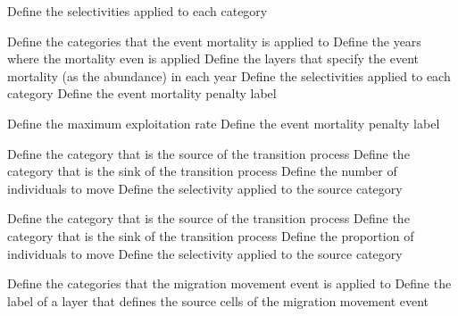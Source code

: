  {Define the selectivities applied to each category}
\par\textbf{}\par
{} {Define the categories that the event mortality is applied to}
 {Define the years where the mortality even is applied}
 {Define the layers that specify the event mortality (as the abundance) in each year}
 {Define the selectivities applied to each category}
 {Define the event mortality penalty label}
\par\textbf{}\par
{}
 {Define the maximum exploitation rate}
 {Define the event mortality penalty label}
\par\textbf{}\par
{} {Define the category that is the source of the transition process}
 {Define the category that is the sink of the transition process}
 {Define the number of individuals to move}
 {Define the selectivity applied to the source category}
\par\textbf{}\par
{} {Define the category that is the source of the transition process}
 {Define the category that is the sink of the transition process}
 {Define the proportion of individuals to move}
 {Define the selectivity applied to the source category}
\par\textbf{}\par
{} {Define the categories that the migration movement event is applied to}
 {Define the label of a layer that defines the source cells of the migration movement event}
